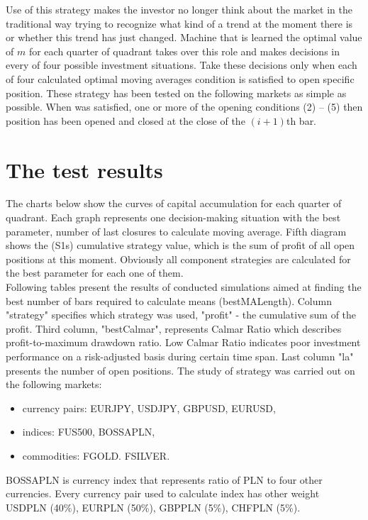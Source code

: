\documentclass{tewiart}
\begin{document}
\indent Use of this strategy makes the investor no longer think about the market in the traditional way trying to recognize what kind of a trend at the moment there is or whether this trend has just changed. Machine that is learned the optimal value of $m$ for each quarter of quadrant takes over this role and makes decisions in every of four possible investment situations. Take these decisions only when each of four calculated optimal moving averages condition is satisfied to open specific position.
These strategy has been tested on the following markets as simple as possible. When was satisfied, one or more of the opening conditions (2) – (5) then position has been opened and closed at the close of the $(i +1)$th bar.





\section{The test results}
\indent The charts below show the curves of capital accumulation for each quarter of quadrant. Each graph represents one decision-making situation with the best parameter, number of last closures to calculate moving average. Fifth diagram shows the (S1s) cumulative strategy value, which is the sum of profit of all open positions at this moment. Obviously all component strategies are calculated for the best parameter for each one of them.\\
\indent Following tables present the results of conducted simulations aimed at finding the best number of bars required to calculate means (bestMALength). Column "strategy" specifies which strategy was used, "profit" - the cumulative sum of the profit. Third column, "bestCalmar", represents Calmar Ratio which describes profit-to-maximum drawdown ratio. Low Calmar Ratio indicates poor investment performance on a risk-adjusted basis during certain time span. Last column "la" presents the number of open positions.
The study of strategy was carried out on the following markets:
\begin{itemize}
\item currency pairs: EURJPY, USDJPY, GBPUSD, EURUSD,
\item indices: FUS500, BOSSAPLN,
\item commodities: FGOLD. FSILVER.
\end{itemize}
BOSSAPLN is currency index that represents ratio of PLN to four other currencies. Every currency pair used to calculate index has other weight USDPLN (40\%), EURPLN (50\%), GBPPLN (5\%), CHFPLN (5\%).
\end{document}
